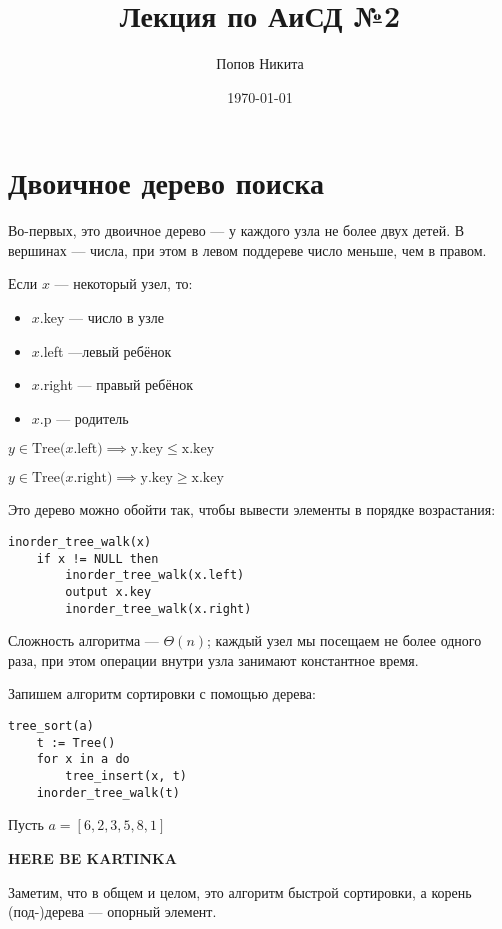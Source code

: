 \documentclass[11pt,a4paper]{article}
\title{Лекция по АиСД №2}
\date{\today}
\author{Попов Никита}
\begin{document}
\maketitle

\section*{Двоичное дерево поиска}

Во-первых, это двоичное дерево --- у каждого узла не более двух детей.
В вершинах --- числа, при этом в левом поддереве число меньше, чем в правом.

Если $x$ --- некоторый узел, то:
\begin{itemize}
    \item $x$.key --- число в узле
    \item $x$.left ---левый ребёнок
    \item $x$.right --- правый ребёнок
    \item $x$.p --- родитель
\end{itemize}

$y\in \text{Tree($x$.left)} \implies \text{y.key} \leqslant \text{x.key}$

$y\in \text{Tree($x$.right)} \implies \text{y.key} \geqslant \text{x.key}$

Это дерево можно обойти так, чтобы вывести элементы в порядке возрастания:

\begin{lstlisting}
inorder_tree_walk(x)
    if x != NULL then
        inorder_tree_walk(x.left)
        output x.key
        inorder_tree_walk(x.right)
\end{lstlisting}

Сложность алгоритма --- $\Theta(n)$; каждый узел мы посещаем не более одного раза, при этом операции внутри узла занимают константное время.

Запишем алгоритм сортировки с помощью дерева:

\begin{lstlisting}
tree_sort(a)
    t := Tree()
    for x in a do
        tree_insert(x, t)
    inorder_tree_walk(t)
\end{lstlisting}

Пусть $a = [6,2,3,5,8,1]$

\vspace{1.5cm}
\textbf{HERE BE KARTINKA}
\vspace{1.5cm}

Заметим, что в общем и целом, это алгоритм быстрой сортировки, а корень (под-)дерева --- опорный элемент.
\end{document}
